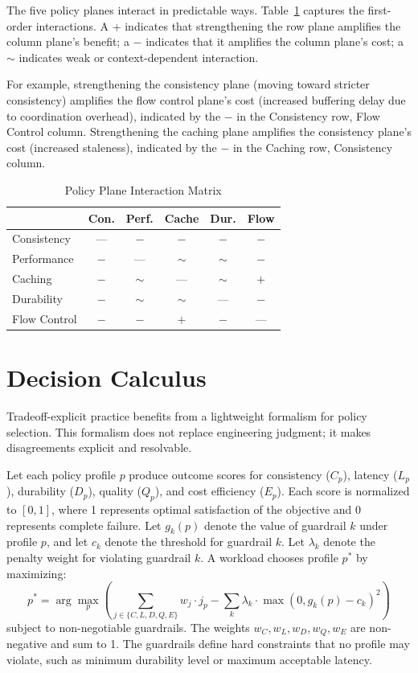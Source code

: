 \documentclass[conference]{IEEEtran}
\begin{document}
The five policy planes interact in predictable ways. Table~\ref{tab:interactions} captures the first-order interactions. A $+$ indicates that strengthening the row plane amplifies the column plane's benefit; a $-$ indicates that it amplifies the column plane's cost; a $\sim$ indicates weak or context-dependent interaction.

For example, strengthening the consistency plane (moving toward stricter consistency) amplifies the flow control plane's cost (increased buffering delay due to coordination overhead), indicated by the $-$ in the Consistency row, Flow Control column. Strengthening the caching plane amplifies the consistency plane's cost (increased staleness), indicated by the $-$ in the Caching row, Consistency column.

\begin{table}[t]
\caption{Policy Plane Interaction Matrix}
\label{tab:interactions}
\centering
\small
\begin{tabular}{@{}l c c c c c@{}}
\toprule
& Con. & Perf. & Cache & Dur. & Flow \\
\midrule
Consistency & --- & $-$ & $-$ & $-$ & $-$ \\
Performance & $-$ & --- & $\sim$ & $\sim$ & $-$ \\
Caching & $-$ & $\sim$ & --- & $\sim$ & $+$ \\
Durability & $-$ & $\sim$ & $\sim$ & --- & $-$ \\
Flow Control & $-$ & $-$ & $+$ & $-$ & --- \\
\bottomrule
\end{tabular}
\end{table}

\section{Decision Calculus}
\label{sec:calculus}

Tradeoff-explicit practice benefits from a lightweight formalism for policy selection. This formalism does not replace engineering judgment; it makes disagreements explicit and resolvable.

Let each policy profile $p$ produce outcome scores for consistency ($C_p$), latency ($L_p$), durability ($D_p$), quality ($Q_p$), and cost efficiency ($E_p$). Each score is normalized to $[0, 1]$, where 1 represents optimal satisfaction of the objective and 0 represents complete failure. Let $g_k(p)$ denote the value of guardrail $k$ under profile $p$, and let $c_k$ denote the threshold for guardrail $k$. Let $\lambda_k$ denote the penalty weight for violating guardrail $k$. A workload chooses profile $p^*$ by maximizing:
\begin{equation}
p^* = \arg\max_p \left( \sum_{j \in \{C,L,D,Q,E\}} w_j \cdot j_p - \sum_k \lambda_k \cdot \max(0, g_k(p) - c_k)^2 \right)
\end{equation}
subject to non-negotiable guardrails. The weights $w_C, w_L, w_D, w_Q, w_E$ are non-negative and sum to 1. The guardrails define hard constraints that no profile may violate, such as minimum durability level or maximum acceptable latency.
\end{document}
